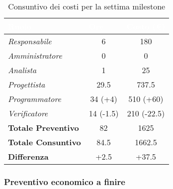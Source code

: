 \begin{table}[H]
    \renewcommand\arraystretch{1.5}
    \centering
    \begin{tabular}{|l|c|c|}
    \hline
    \rowcolor[HTML]{036400}
    \textcolor{white}{\textbf{Ruolo}} & \multicolumn{1}{l|}{\textcolor{white}{\textbf{Ore}}} & \multicolumn{1}{l|}{\textcolor{white}{\textbf{Costo (€)}}} \\ \hline
    \rowcolor[HTML]{EFEFEF}\textit{Responsabile}      & 6       & 180                 \\ \hline
    \rowcolor[HTML]{C0C0C0}\textit{Amministratore}    & 0       & 0                 \\ \hline
    \rowcolor[HTML]{EFEFEF}\textit{Analista}          & 1       & 25                 \\ \hline
    \rowcolor[HTML]{C0C0C0}\textit{Progettista}       & 29.5    & 737.5                 \\ \hline
    \rowcolor[HTML]{EFEFEF}\textit{Programmatore}     & 34 (+4) & 510 (+60)                 \\ \hline
    \rowcolor[HTML]{C0C0C0}\textit{Verificatore}      & 14 (-1.5) & 210 (-22.5)                 \\ \hline
    \rowcolor[HTML]{EFEFEF}\textbf{Totale Preventivo} & 82      & 1625                \\ \hline
    \rowcolor[HTML]{C0C0C0}\textbf{Totale Consuntivo} & 84.5    & 1662.5            \\ \hline
    \rowcolor[HTML]{EFEFEF}\textbf{Differenza}        & +2.5    & +37.5                \\ \hline
    \end{tabular}
    \caption{Consuntivo dei costi per la settima milestone}
\end{table}

\subsubsection{Preventivo economico a finire}

